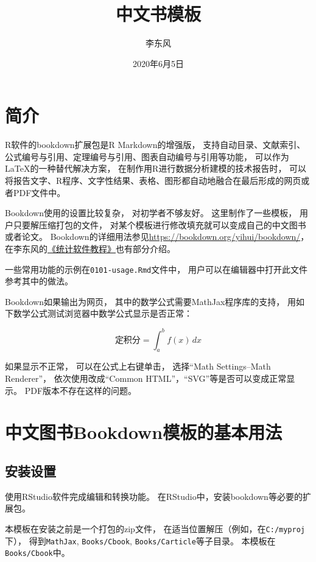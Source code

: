 \documentclass[
]{book}
\title{中文书模板}
\author{李东风}
\date{2020年6月5日}
\theoremstyle{definition}
\theoremstyle{definition}
\theoremstyle{definition}
\theoremstyle{definition}
\theoremstyle{remark}
\begin{document}
\maketitle

{
\setcounter{tocdepth}{1}
\tableofcontents
}
\hypertarget{ux7b80ux4ecb}{%
\chapter*{简介}\label{ux7b80ux4ecb}}

R软件的bookdown扩展包是R Markdown的增强版，
支持自动目录、文献索引、公式编号与引用、定理编号与引用、图表自动编号与引用等功能，
可以作为LaTeX的一种替代解决方案，
在制作用R进行数据分析建模的技术报告时，
可以将报告文字、R程序、文字性结果、表格、图形都自动地融合在最后形成的网页或者PDF文件中。

Bookdown使用的设置比较复杂，
对初学者不够友好。
这里制作了一些模板，
用户只要解压缩打包的文件，
对某个模板进行修改填充就可以变成自己的中文图书或者论文。
Bookdown的详细用法参见\url{https://bookdown.org/yihui/bookdown/}，
在李东风的\href{http://www.math.pku.edu.cn/teachers/lidf/docs/Rbook/html/_Rbook/index.html}{《统计软件教程》}也有部分介绍。

一些常用功能的示例在\texttt{0101-usage.Rmd}文件中，
用户可以在编辑器中打开此文件参考其中的做法。

Bookdown如果输出为网页，
其中的数学公式需要MathJax程序库的支持，
用如下数学公式测试浏览器中数学公式显示是否正常：

\[
\text{定积分} = \int_a^b f(x) \,dx
\]

如果显示不正常，
可以在公式上右键单击，
选择``Math Settings--Math Renderer''，
依次使用改成``Common HTML''，``SVG''等是否可以变成正常显示。
PDF版本不存在这样的问题。

\hypertarget{usage}{%
\chapter{中文图书Bookdown模板的基本用法}\label{usage}}

\hypertarget{usage-ins}{%
\section{安装设置}\label{usage-ins}}

使用RStudio软件完成编辑和转换功能。
在RStudio中，安装bookdown等必要的扩展包。

本模板在安装之前是一个打包的zip文件，
在适当位置解压（例如，在\texttt{C:/myproj}下），
得到\texttt{MathJax}, \texttt{Books/Cbook}, \texttt{Books/Carticle}等子目录。
本模板在\texttt{Books/Cbook}中。
\end{document}

